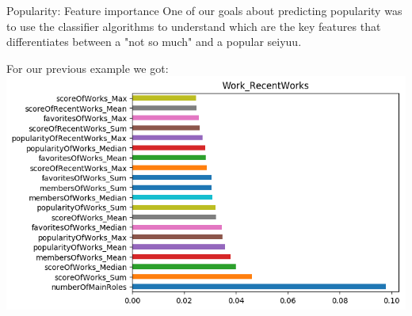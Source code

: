 \begin{frame}{Popularity: Feature importance}
One of our goals about predicting popularity was to use the classifier algorithms to understand which are the key features that differentiates between a "not so much" and a popular seiyuu.
\vspace{5pt}

For our previous example we got:
\includegraphics[scale=.5]{graphics/Work_RecentWorks_DTC_featureImportances.png} 

\end{frame}
